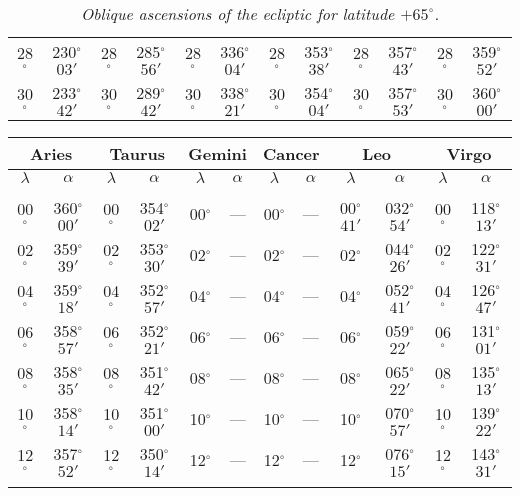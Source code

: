 \begin{table}
{\begin{tabular}{cc|cc|cc|cc|cc|cc}
28$^\circ$ & 230$^\circ$$03'$ & 28$^\circ$ & 285$^\circ$$56'$ & 28$^\circ$ & 336$^\circ$$04'$ & 28$^\circ$ & 353$^\circ$$38'$ &  28$^\circ$ & 357$^\circ$$43'$ & 28$^\circ$ & 359$^\circ$$52'$\\
30$^\circ$ & 233$^\circ$$42'$ & 30$^\circ$ & 289$^\circ$$42'$ & 30$^\circ$ & 338$^\circ$$21'$ & 30$^\circ$ & 354$^\circ$$04'$ &  30$^\circ$ & 357$^\circ$$53'$ & 30$^\circ$ & 360$^\circ$$00'$\\
\end{tabular}}
\caption{\em Oblique ascensions of the ecliptic  for latitude $+65^\circ$.}
\end{table}

\begin{table}
\centering
{\small \begin{tabular}{cc|cc|cc|cc|cc|cc}
\multicolumn{2}{c}{Aries}\vline & \multicolumn{2}{c}{Taurus} \vline& \multicolumn{2}{c}{Gemini} \vline& \multicolumn{2}{c}{Cancer}\vline &
\multicolumn{2}{c}{Leo}\vline & \multicolumn{2}{c}{Virgo}\\\hline
$\lambda$& $\alpha$& $\lambda$& $\alpha$& $\lambda$& $\alpha$& $\lambda$& $\alpha$& $\lambda$& $\alpha$& $\lambda$& $\alpha$\\\hline
&&&&&&&&&&&\\[-2ex]
00$^\circ$ & 360$^\circ$$00'$ & 00$^\circ$ & 354$^\circ$$02'$ & 00$^\circ$ &  ---& 00$^\circ$& --- & 00$^\circ$$41'$ & 032$^\circ$$54'$& 00$^\circ$ & 118$^\circ$$13'$\\
02$^\circ$ & 359$^\circ$$39'$ & 02$^\circ$ & 353$^\circ$$30'$ & 02$^\circ$ & --- & 02$^\circ$ & --- & 02$^\circ$ & 044$^\circ$$26'$ & 02$^\circ$ & 122$^\circ$$31'$\\
04$^\circ$ & 359$^\circ$$18'$ & 04$^\circ$ & 352$^\circ$$57'$ & 04$^\circ$ & --- & 04$^\circ$ & --- & 04$^\circ$ & 052$^\circ$$41'$ & 04$^\circ$ & 126$^\circ$$47'$\\
06$^\circ$ & 358$^\circ$$57'$ & 06$^\circ$ & 352$^\circ$$21'$ & 06$^\circ$ & --- & 06$^\circ$ & --- & 06$^\circ$ & 059$^\circ$$22'$ & 06$^\circ$ & 131$^\circ$$01'$\\
08$^\circ$ & 358$^\circ$$35'$ & 08$^\circ$ & 351$^\circ$$42'$ & 08$^\circ$ & --- & 08$^\circ$ & --- & 08$^\circ$ & 065$^\circ$$22'$ & 08$^\circ$ & 135$^\circ$$13'$\\
10$^\circ$ & 358$^\circ$$14'$ & 10$^\circ$ & 351$^\circ$$00'$ & 10$^\circ$ & --- & 10$^\circ$ & --- & 10$^\circ$ & 070$^\circ$$57'$ & 10$^\circ$ & 139$^\circ$$22'$\\
12$^\circ$ & 357$^\circ$$52'$ & 12$^\circ$ & 350$^\circ$$14'$ & 12$^\circ$ & --- & 12$^\circ$ & --- & 12$^\circ$ & 076$^\circ$$15'$ & 12$^\circ$ & 143$^\circ$$31'$\\
$$
\end{tabular}}
\end{table}
